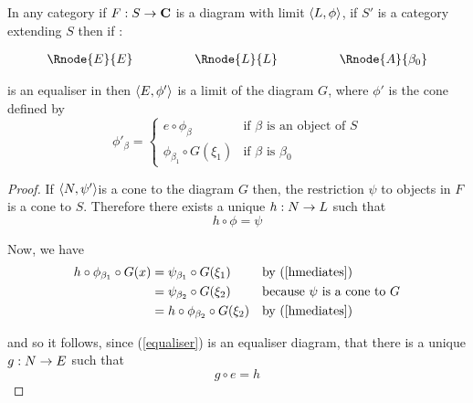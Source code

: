 \documentclass[10pt,a4paper]{scrartcl}
\begin{document}
\begin{lemma}
In any category  if $F: S \rightarrow \textbf{C}$ is a diagram with limit $\langle L,\phi\rangle$,
if $S'$ is a category extending $S$  then if :
\begin{center}
\begin{equation}
\label{equaliser}
\begin{array}{cp{1cm}cp{1cm} c}
\Rnode{E}{E}& &    \Rnode{L}{L}  & & \Rnode{A}{\beta_0} 
\end{array}
\end{equation}
\setlength{\arroffsetA}{3pt}
\setlength{\arroffsetB}{3pt}
\setlength{\arroffsetA}{-3pt}
\setlength{\arroffsetB}{-3pt}
\arreset
\end{center}
is an equaliser in  then $\langle E,\phi'\rangle$ is a limit of the diagram $G$, where
$\phi'$ is the cone defined by
\begin{equation*}
\phi'_\beta =
\left\{
	\begin{array}{ll}
		e \circ \phi_\beta           & \mbox{if } \beta \mbox{ is an object of } S  \\
		\phi_{\beta_1} \circ G(\xi_1) & \mbox{if } \beta \mbox{ is } \beta_0 
	\end{array}
\right.
\end{equation*}

\end{lemma}
\begin{proof}
If $\langle N,\psi'\rangle$is a cone to the diagram $G$ then, the restriction $\psi$ to objects in $F$ is a cone to  $S$. Therefore there exists a unique $h : N \rightarrow L$ such that 
\begin{equation}
\label{hmediates}
h \circ \phi = \psi
\end{equation}

\noindent
Now, we have 
\begin{align*}
h \circ \phi_{\beta_1} \circ G(x)
             & = \psi_{\beta_1} \circ G(\xi_1)         && \mbox{by (\ref{hmediates})}\\
             & = \psi_{\beta_2} \circ G(\xi_2)         && \mbox{because } \psi \mbox{ is a cone to } G \\
             & = h \circ \phi_{\beta_2} \circ G(\xi_2) && \mbox{by (\ref{hmediates}) }\\
\end{align*}

\noindent
and so it follows, since (\ref{equaliser}) is an equaliser diagram,
that there is a unique $g: N \rightarrow E$ such that 
\begin{equation}
\label{gmediates}
g \circ e = h
\end{equation}



\end{proof}


\end{document}
